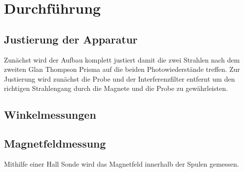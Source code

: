 \section{Durchführung}
\label{sec:Durchfuehrung}
\subsection{Justierung der Apparatur}
Zunächst wird der Aufbau komplett justiert damit die zwei Strahlen nach dem zweiten Glan Thompson Prisma auf die beiden Photowiederstände treffen.
Zur Justierung wird zunächst die Probe und der Interferenzfilter entfernt um den richtigen Strahlengang durch die Magnete und die Probe zu gewährleisten.
\subsection{Winkelmessungen}
\subsection{Magnetfeldmessung}
Mithilfe einer Hall Sonde wird das Magnetfeld innerhalb der Spulen gemessen.